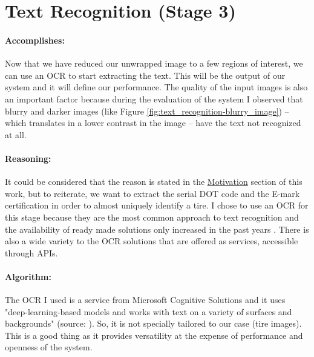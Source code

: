 \section{Text Recognition (Stage 3)}\label{sec:text-recognition}

\paragraph*{Accomplishes:}\mbox{}\par

Now that we have reduced our unwrapped image to a few regions of interest, we can use an OCR to start extracting the text. This will be the output of our system and it will define our performance. The quality of the input images is also an important factor because during the evaluation of the system I observed that blurry and darker images (like Figure \ref{fig:text_recognition-blurry_image}) -- which translates in a lower contrast in the image -- have the text not recognized at all.

\paragraph*{Reasoning:}\mbox{}\par

It could be considered that the reason is stated in the \hyperref[sec:motivation]{Motivation} section of this work, but to reiterate, we want to extract the serial DOT code and the E-mark certification in order to almost uniquely identify a tire. I chose to use an OCR for this stage because they are the most common approach to text recognition and the availability of ready made solutions only increased in the past years \cite{site:OCR_comparison}. There is also a wide variety to the OCR solutions that are offered as services, accessible through APIs.

\paragraph*{Algorithm:}\mbox{}\par
The OCR I used is a service from Microsoft Cognitive Solutions \cite{site:Microsoft_Cognitive_Services} and it uses "deep-learning-based models and works with text on a variety of surfaces and backgrounds" (source: \cite{site:Microsoft_Cognitive_Services-Explained}). So, it is not specially tailored to our case (tire images). This is a good thing as it provides versatility at the expense of performance and openness of the system.

